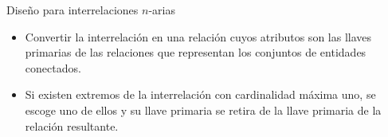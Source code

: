 \begin{frame}{Dise\~no para interrelaciones $n$-arias}
{        \begin{block}{}
            \begin{itemize}
                \item Convertir la interrelaci\'on en una relaci\'on cuyos atributos son las llaves primarias
                de las relaciones que representan los conjuntos de entidades conectados.
                \item   Si existen extremos
                de la interrelaci\'on con cardinalidad m\'axima uno, se escoge uno de ellos y su llave primaria
                se retira de la llave primaria de la relaci\'on resultante.
            \end{itemize}
        \end{block}
    }
        
     

   

   

\end{frame}

